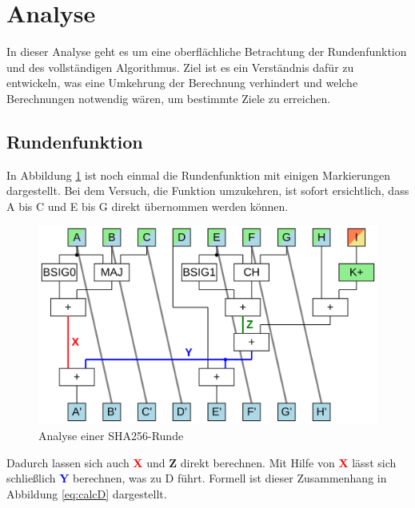 \section{Analyse}
\label{sec:sha256:analyse}

In dieser Analyse geht es um eine oberflächliche Betrachtung der Rundenfunktion und des vollständigen Algorithmus.
Ziel ist es ein Verständnis dafür zu entwickeln, was eine Umkehrung der Berechnung verhindert und welche Berechnungen
notwendig wären, um bestimmte Ziele zu erreichen.

\subsection{Rundenfunktion}
In Abbildung \ref{fig:sha256coreA} ist noch einmal die Rundenfunktion mit einigen Markierungen dargestellt.
Bei dem Versuch, die Funktion umzukehren, ist sofort ersichtlich, dass A bis C und E bis G direkt übernommen werden können.

\begin{figure}[!h]
  \centering
  \includegraphics[scale=0.4]{images/sha256coreA}
  \caption{Analyse einer SHA256-Runde}
  \label{fig:sha256coreA}
\end{figure}

Dadurch lassen sich auch \textcolor{red}{\textbf{X}} und \textcolor{Strong Green}{\textbf{Z}} direkt berechnen.
Mit Hilfe von \textcolor{red}{\textbf{X}} lässt sich schließlich \textcolor{blue}{\textbf{Y}} berechnen, was zu D führt.
Formell ist dieser Zusammenhang in Abbildung \ref{eq:calcD} dargestellt.

